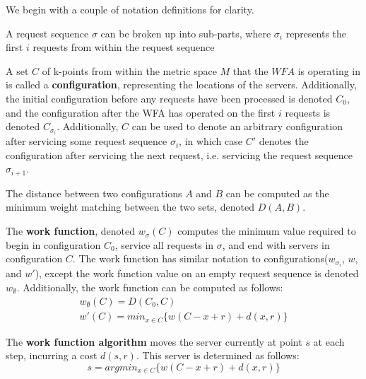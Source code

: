 
We begin with a couple of notation definitions for clarity.

\begin{definition}
    A request sequence $\sigma$ can be broken up into sub-parts, where $\sigma_i$ represents the first $i$ requests from within the request sequence
\end{definition}

\begin{definition}
    A set $C$ of k-points from within the metric space $M$ that the $WFA$ is operating in is called a \textbf{configuration}, representing the locations of the servers. Additionally, the initial configuration before any requests have been processed is denoted $C_0$, and the configuration after the WFA has operated on the first $i$ requests is denoted $C_{\sigma_i}$. Additionally, $C$ can be used to denote an arbitrary configuration after servicing some request sequence $\sigma_i$, in which case $C'$ denotes the configuration after servicing the next request, i.e. servicing the request sequence $\sigma_{i+1}$.
\end{definition}

\begin{definition}
    The distance between two configurations $A$ and $B$ can be computed as the minimum weight matching between the two sets, denoted $D(A, B)$.
\end{definition}

\begin{definition}
    The \textbf{work function}, denoted $w_\sigma(C)$ computes the minimum value required to begin in configuration $C_0$, service all requests in $\sigma$, and end with servers in configuration $C$. The work function has similar notation to configurations($w_{\sigma_i}$, $w$, and $w'$), except the work function value on an empty request sequence is denoted $w_\emptyset$. Additionally, the work function can be computed as follows:
    \begin{equation*}
        \begin{gathered}
            w_\emptyset(C) = D(C_0, C) \\
            w'(C) = min_{x \in C} \{ w(C - x + r) + d(x, r)\}
        \end{gathered}
    \end{equation*}
\end{definition}

\begin{definition}
    The \textbf{work function algorithm} moves the server currently at point $s$ at each step, incurring a cost $d(s,r)$. This server is determined as follows:
    \begin{equation*}
        s = argmin_{x \in C} \{ w(C-x+r) + d(x,r)\}
    \end{equation*}
\end{definition}